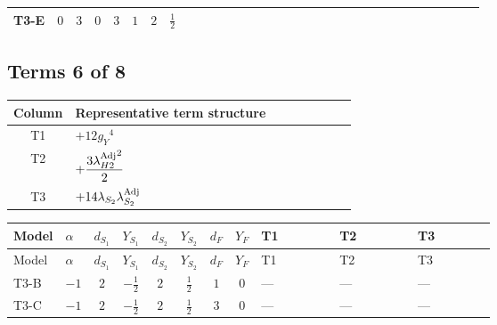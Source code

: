 \documentclass[8pt]{article}
\begin{document}
\begin{landscape}
\begin{longtable}{@{}llcccccc >{\raggedright\arraybackslash}p{0.21\linewidth} >{\raggedright\arraybackslash}p{0.21\linewidth} >{\raggedright\arraybackslash}p{0.21\linewidth}@{}}
\midrule
T3-E & $0$ & $3$ & $0$ & $3$ & $1$ & $2$ & $\frac{1}{2}$ & \scriptsize\adjustbox{max width=\linewidth}{$\begin{gathered} 21 {g_2}^4\end{gathered}$} & \scriptsize\adjustbox{max width=\linewidth}{$\begin{gathered} +{g_Y}^2 \left(12 {g_2}^2-12 {\lambda_{S_2}}-6 {\lambda_{S_2}^{\rm Adj}}\right)\end{gathered}$} & \scriptsize\adjustbox{max width=\linewidth}{$\begin{gathered} +{g_2}^2 (-24 {\lambda_{S_2}}-12 {\lambda_{S_2}^{\rm Adj}})\end{gathered}$} \\
\midrule
\bottomrule
\end{longtable}
\clearpage
\subsection*{Terms 6 of 8}
\begin{center}
\begin{tabular}{@{}c >{\raggedright\arraybackslash}p{0.82\linewidth}@{}}
\toprule
Column & Representative term structure \\
\midrule
T1 & \(\displaystyle +12 {g_Y}^4\) \\
\midrule
T2 & \(\displaystyle +\frac{3 {\lambda_{H2}^{\rm Adj}}^2}{2}\) \\
\midrule
T3 & \(\displaystyle +14 {\lambda_{S_2}} {\lambda_{S_2}^{\rm Adj}}\) \\
\midrule
\bottomrule
\end{tabular}
\end{center}
\smallskip
\tiny
\begin{longtable}{@{}llcccccc >{\raggedright\arraybackslash}p{0.21\linewidth} >{\raggedright\arraybackslash}p{0.21\linewidth} >{\raggedright\arraybackslash}p{0.21\linewidth}@{}}
\toprule
Model & $\alpha$ & $d_{S_1}$ & $Y_{S_1}$ & $d_{S_2}$ & $Y_{S_2}$ & $d_F$ & $Y_F$ & T1 & T2 & T3 \\
\midrule
\endfirsthead
\toprule
Model & $\alpha$ & $d_{S_1}$ & $Y_{S_1}$ & $d_{S_2}$ & $Y_{S_2}$ & $d_F$ & $Y_F$ & T1 & T2 & T3 \\
\midrule
\endhead
T3-B & $-1$ & $2$ & $-\frac{1}{2}$ & $2$ & $\frac{1}{2}$ & $1$ & $0$ & --- & --- & --- \\
\midrule
T3-C & $-1$ & $2$ & $-\frac{1}{2}$ & $2$ & $\frac{1}{2}$ & $3$ & $0$ & --- & --- & --- \\
\midrule

\end{longtable}
\end{landscape}
\end{document}
